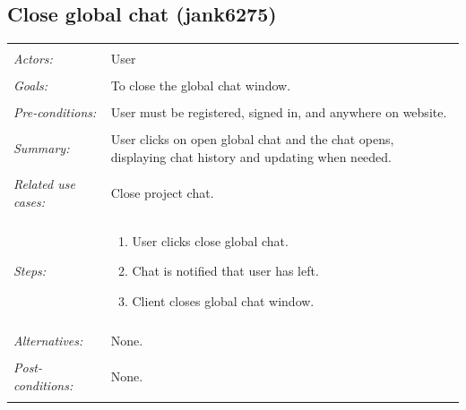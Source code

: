 \documentclass[11pt]{report}
\begin{document}
\subsection{Close global chat (jank6275)}
\begin{tabular}{ p{2cm} p{12cm} }
 \hline
 \\
 \textit{Actors:} & User \\ 
 \\
 \textit{Goals:} & To close the global chat window. \\
 \\
 \textit{Pre-conditions:} & User must be registered, signed in, and anywhere on website.  \\
 \\
 \textit{Summary:} & User clicks on open global chat and the chat opens, displaying chat history and updating when needed. \\ 
 \\
 \textit{Related use cases:} & Close project chat. \\ 
 \\
 \textit{Steps:} & \begin{enumerate}
  \item User clicks close global chat.
  \item Chat is notified that user has left.
  \item Client closes global chat window.
 \end{enumerate} \\
 \\
 \textit{Alternatives:} & None. \\
 \\
 \textit{Post-conditions:} & None. \\
 \\
\hline
\end{tabular}
\end{document}
